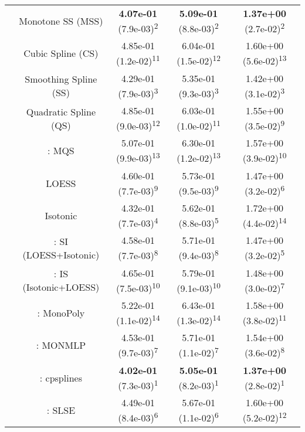 \begin{tabular}{ccccc}
&Monotone SS (MSS)& \textbf{4.07e-01} (7.9e-03)\textsuperscript{2}& \textbf{5.09e-01} (8.8e-03)\textsuperscript{2}& \textbf{1.37e+00} (2.7e-02)\textsuperscript{2}\tabularnewline
&Cubic Spline (CS)& 4.85e-01 (1.2e-02)\textsuperscript{11}& 6.04e-01 (1.5e-02)\textsuperscript{12}& 1.60e+00 (5.6e-02)\textsuperscript{13}\tabularnewline
&Smoothing Spline (SS)& 4.29e-01 (7.9e-03)\textsuperscript{3}& 5.35e-01 (9.3e-03)\textsuperscript{3}& 1.42e+00 (3.1e-02)\textsuperscript{3}\tabularnewline
&Quadratic Spline (QS)& 4.85e-01 (9.0e-03)\textsuperscript{12}& 6.03e-01 (1.0e-02)\textsuperscript{11}& 1.55e+00 (3.5e-02)\textsuperscript{9}\tabularnewline
&\textcite{heMonotoneBsplineSmoothing1998}: MQS& 5.07e-01 (9.9e-03)\textsuperscript{13}& 6.30e-01 (1.2e-02)\textsuperscript{13}& 1.57e+00 (3.9e-02)\textsuperscript{10}\tabularnewline
&LOESS& 4.60e-01 (7.7e-03)\textsuperscript{9}& 5.73e-01 (9.5e-03)\textsuperscript{9}& 1.47e+00 (3.2e-02)\textsuperscript{6}\tabularnewline
&Isotonic& 4.32e-01 (7.7e-03)\textsuperscript{4}& 5.62e-01 (8.8e-03)\textsuperscript{5}& 1.72e+00 (4.4e-02)\textsuperscript{14}\tabularnewline
&\textcite{mammenEstimatingSmoothMonotone1991}: SI (LOESS+Isotonic)& 4.58e-01 (7.7e-03)\textsuperscript{8}& 5.71e-01 (9.4e-03)\textsuperscript{8}& 1.47e+00 (3.2e-02)\textsuperscript{5}\tabularnewline
&\textcite{mammenEstimatingSmoothMonotone1991}: IS (Isotonic+LOESS)& 4.65e-01 (7.5e-03)\textsuperscript{10}& 5.79e-01 (9.1e-03)\textsuperscript{10}& 1.48e+00 (3.0e-02)\textsuperscript{7}\tabularnewline
&\textcite{murrayFastFlexibleMethods2016}: MonoPoly& 5.22e-01 (1.1e-02)\textsuperscript{14}& 6.43e-01 (1.3e-02)\textsuperscript{14}& 1.58e+00 (3.8e-02)\textsuperscript{11}\tabularnewline
&\textcite{cannonMonmlpMultilayerPerceptron2017}: MONMLP& 4.53e-01 (9.7e-03)\textsuperscript{7}& 5.71e-01 (1.1e-02)\textsuperscript{7}& 1.54e+00 (3.6e-02)\textsuperscript{8}\tabularnewline
&\textcite{navarro-garciaConstrainedSmoothingOutofrange2023}: cpsplines& \textbf{4.02e-01} (7.3e-03)\textsuperscript{1}& \textbf{5.05e-01} (8.2e-03)\textsuperscript{1}& \textbf{1.37e+00} (2.8e-02)\textsuperscript{1}\tabularnewline
&\textcite{groeneboomConfidenceIntervalsMonotone2023}: SLSE& 4.49e-01 (8.4e-03)\textsuperscript{6}& 5.67e-01 (1.1e-02)\textsuperscript{6}& 1.60e+00 (5.2e-02)\textsuperscript{12}\tabularnewline
\bottomrule
\end{tabular}
